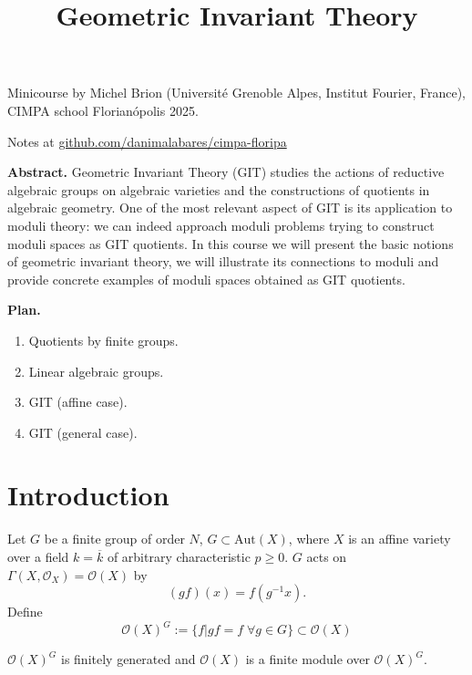 


\title{Geometric Invariant Theory}
\maketitle

\noindent
Minicourse by Michel Brion (Universit\'e
Grenoble Alpes, Institut Fourier, France),
CIMPA school Florian\'opolis 2025.

\medskip\noindent
Notes at
\href{%
http://github.com/danimalabares/cimpa-floripa
}{%
github.com/danimalabares/cimpa-floripa
}

\bigskip\noindent

{\bf Abstract.} Geometric Invariant Theory
(GIT) studies the actions of reductive
algebraic groups on algebraic varieties and
the constructions of quotients in algebraic
geometry. One of the most relevant aspect of
GIT is its application to moduli theory: we
can indeed approach moduli problems trying to
construct moduli spaces as GIT quotients. In
this course we will present the basic notions
of geometric invariant theory, we will
illustrate its connections to moduli and
provide concrete examples of moduli spaces
obtained as GIT quotients.

\bigskip\noindent
\tableofcontents
\bigskip\noindent

{\bf Plan.}

\begin{enumerate}
\item Quotients by finite groups.
\item Linear algebraic groups.
\item GIT (affine case).
\item GIT (general case).
\end{enumerate}

\section{Introduction}
\label{section-introduction}

Let $G$ be a finite group of order $N$, $G
\subset \text{Aut}(X)$,  where $X$ is an
affine variety over a field  $k=\overline{k}$
of arbitrary characteristic $p \geq 0$. $G$
acts on
$\Gamma(X,\mathcal{O}_X)=\mathcal{O}(X)$ by
$$
(gf)(x)=f(g^{-1}x).
$$
Define
$$
\mathcal{O}(X)^G:=\{f|gf=f\;\forall g \in
G\}\subset\mathcal{O}(X)
$$

\begin{proposition}
\label{git-label-018}
$\mathcal{O}(X)^G$ is finitely generated and
$\mathcal{O}(X)$ is a finite module over
$\mathcal{O}(X)^G$.
\end{proposition}

